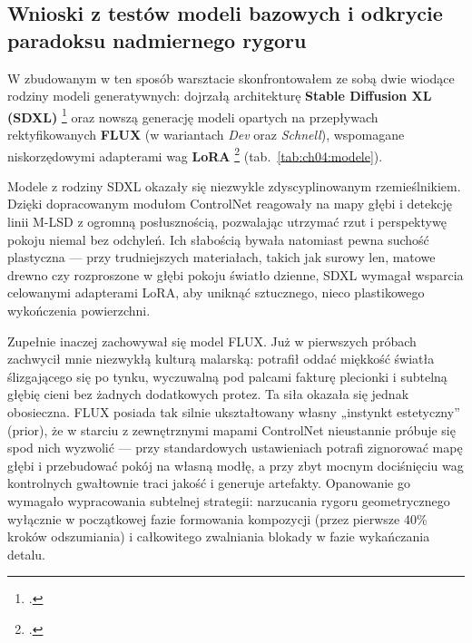 \subsection{Wnioski z testów modeli bazowych i odkrycie paradoksu nadmiernego rygoru}
\label{ch04:sec:modele-testy}

W zbudowanym w ten sposób warsztacie skonfrontowałem ze sobą dwie wiodące rodziny modeli generatywnych: dojrzałą architekturę \textbf{Stable Diffusion XL (SDXL)} \textcolor{orange}{\footcite{podell2024sdxl}} oraz nowszą generację modeli opartych na przepływach rektyfikowanych \textbf{FLUX} (w wariantach \emph{Dev} oraz \emph{Schnell}), wspomagane niskorzędowymi adapterami wag \textbf{LoRA} \footcite{hu2022lora} (tab.~\ref{tab:ch04:modele}).

Modele z rodziny SDXL okazały się niezwykle zdyscyplinowanym rzemieślnikiem. Dzięki dopracowanym modułom ControlNet reagowały na mapy głębi i detekcję linii M-LSD z ogromną posłusznością, pozwalając utrzymać rzut i perspektywę pokoju niemal bez odchyleń. Ich słabością bywała natomiast pewna suchość plastyczna --- przy trudniejszych materiałach, takich jak surowy len, matowe drewno czy rozproszone w głębi pokoju światło dzienne, SDXL wymagał wsparcia celowanymi adapterami LoRA, aby uniknąć sztucznego, nieco plastikowego wykończenia powierzchni.

Zupełnie inaczej zachowywał się model FLUX. Już w pierwszych próbach zachwycił mnie niezwykłą kulturą malarską: potrafił oddać miękkość światła ślizgającego się po tynku, wyczuwalną pod palcami fakturę plecionki i subtelną głębię cieni bez żadnych dodatkowych protez. Ta siła okazała się jednak obosieczna. FLUX posiada tak silnie ukształtowany własny „instynkt estetyczny” (prior), że w starciu z zewnętrznymi mapami ControlNet nieustannie próbuje się spod nich wyzwolić --- przy standardowych ustawieniach potrafi zignorować mapę głębi i przebudować pokój na własną modłę, a przy zbyt mocnym dociśnięciu wag kontrolnych gwałtownie traci jakość i generuje artefakty. Opanowanie go wymagało wypracowania subtelnej strategii: narzucania rygoru geometrycznego wyłącznie w początkowej fazie formowania kompozycji (przez pierwsze 40\% kroków odszumiania) i całkowitego zwalniania blokady w fazie wykańczania detalu.

